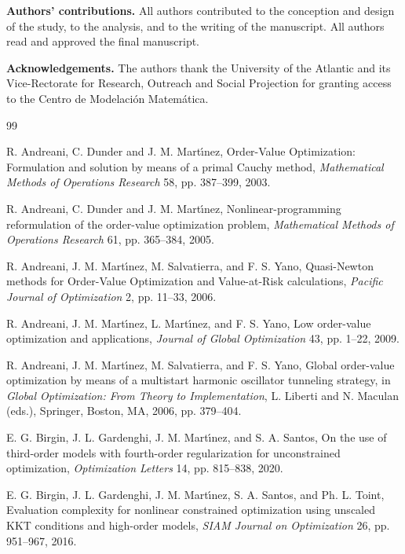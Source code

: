 \documentclass[11pt]{article}
\begin{document}
\medskip
\noindent
\textbf{Authors' contributions.} All authors contributed to the conception and design of the study, to the analysis, and to the writing of the manuscript. All authors read and approved the final manuscript.

\medskip
\noindent
\textbf{Acknowledgements.} The authors thank the University of the Atlantic and its Vice-Rectorate for Research, Outreach and Social Projection for granting access to the Centro de Modelación Matemática.

\clearpage

\begin{thebibliography}{99}

 R. Andreani, C. Dunder and J. M. Mart\'{\i}nez, Order-Value Optimization: Formulation and solution by means of a primal Cauchy method, \textit{Mathematical Methods of Operations Research} 58, pp. 387--399, 2003.

 R. Andreani, C. Dunder and J. M. Mart\'{\i}nez, Nonlinear-programming reformulation of the order-value optimization problem, \textit{Mathematical Methods of Operations Research} 61, pp. 365--384, 2005.

 R. Andreani, J. M. Mart\'{\i}nez, M. Salvatierra, and F. S. Yano, Quasi-Newton methods for Order-Value Optimization and Value-at-Risk calculations, \textit{Pacific Journal of Optimization} 2, pp. 11--33, 2006.

 R. Andreani, J. M. Mart\'{\i}nez, L. Mart\'{\i}nez, and F. S. Yano, Low order-value optimization and applications, \textit{Journal of Global Optimization} 43, pp. 1--22, 2009.

 R. Andreani, J. M. Mart\'{\i}nez, M. Salvatierra, and F. S. Yano, Global order-value optimization by means of a multistart harmonic oscillator tunneling strategy, in \textit{Global Optimization: From Theory to Implementation}, L. Liberti and N. Maculan (eds.), Springer, Boston, MA, 2006, pp. 379--404.

 E. G. Birgin, J. L. Gardenghi, J. M. Mart\'{\i}nez, and S. A. Santos, On the use of third-order models with fourth-order regularization for unconstrained optimization, \textit{Optimization Letters} 14, pp. 815--838, 2020.

 E. G. Birgin, J. L. Gardenghi, J. M. Mart\'{\i}nez, S. A. Santos, and Ph. L. Toint, Evaluation complexity for nonlinear constrained optimization using unscaled KKT conditions and high-order models, \textit{SIAM Journal on Optimization} 26, pp. 951--967, 2016.


\end{thebibliography}
\end{document}
